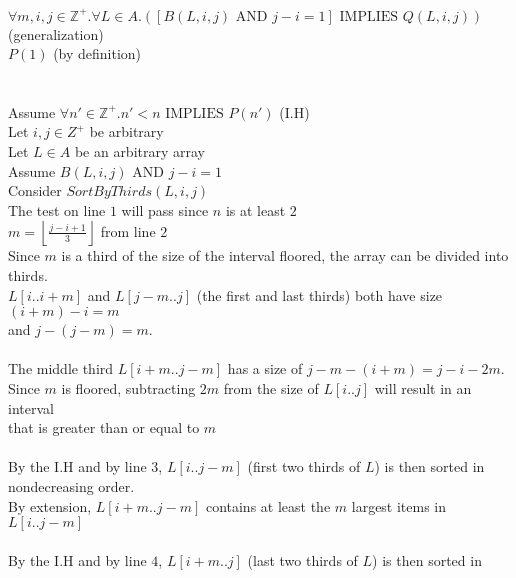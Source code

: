 \documentclass[11pt]{article}
\def\ints {{\mathbb Z}}
\newcommand{\Implies}{\mbox{ IMPLIES }}
\newcommand{\And}{\mbox{ AND }}
\begin{document}
\begin{enumerate}
\begin{solution}
\null\quad $\forall m,i,j\in\ints^+.\forall L\in A.\left([B(L, i, j) \And  j - i= 1]\Implies Q(L, i, j)\right)$ (generalization)\\
\null\quad $P(1)$ (by definition)\\\\
\null{}\\
\null\qquad Assume $\forall n'\in\ints^+.n'<n \Implies P(n')$ (I.H)\\
\null\qquad\quad Let $i, j\in Z^+$ be arbitrary\\
\null\qquad\qquad Let $L\in A$ be an arbitrary array\\
\null\qquad\qquad\quad Assume $B(L, i, j) \And  j - i= 1$\\
\null\qquad\qquad\quad Consider $SortByThirds(L, i, j)$\\
\null\qquad\qquad\quad The test on line $1$ will pass since $n$ is at least $2$\\
\null\qquad\qquad\quad $m = \left\lfloor\frac{j-i+1}3\right\rfloor$ from line $2$\\
\null\qquad\qquad\quad Since $m$ is a third of the size of the interval floored, the array can be divided into \\
\null\qquad\qquad\quad thirds.\\
\null\qquad\qquad\quad $L[i..i+m]$ and $L[j-m..j]$ (the first and last thirds) both have size $(i+m) - i=m$ \\
\null\qquad\qquad\quad and $j-(j-m)=m$.\\\\
\null\qquad\qquad\quad The middle third $L[i+m..j-m]$ has a size of $j-m - (i+m) = j-i-2m$.\\
\null\qquad\qquad\quad Since $m$ is floored, subtracting $2m$ from the size of $L[i..j]$ will result in an interval \\
\null\qquad\qquad\quad that is greater than or equal to $m$\\\\
\null\qquad\qquad\quad By the I.H and by line $3$, $L[i..j-m]$ (first two thirds of $L$) is then sorted in \\
\null\qquad\qquad\quad nondecreasing order.\\
\null\qquad\qquad\quad By extension, $L[i+m..j-m]$ contains at least the $m$ largest items in $L[i..j-m]$\\\\
\null\qquad\qquad\quad By the I.H and by line $4$, $L[i+m..j]$ (last two thirds of $L$) is then sorted in \\

\end{solution}
\end{enumerate}
\end{document}
